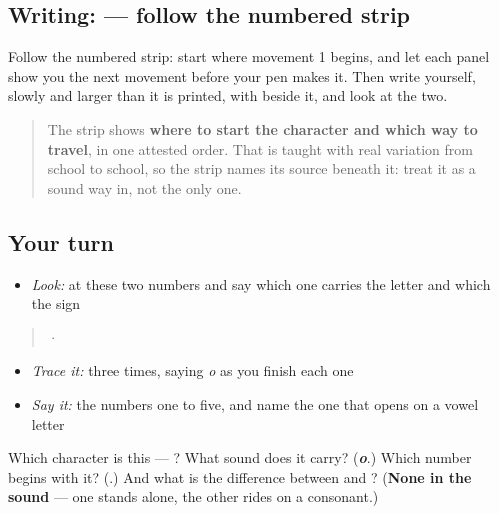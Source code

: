 \subsection*{Writing:  — follow the numbered strip}

Follow the numbered strip: start where movement 1 begins, and let each panel show you the next movement before your pen makes it. Then write  yourself, slowly and larger than it is printed, with  beside it, and look at the two.

\begin{quote}
The strip shows \textbf{where to start the character and which way to travel}, in one attested order. That is taught with real variation from school to school, so the strip names its source beneath it: treat it as a sound way in, not the only one.
\end{quote}

\subsection*{Your turn}
\begin{itemize}
\raggedright
  \item \emph{Look:} at these two numbers and say which one carries the letter  and which the sign 
\end{itemize}

\begin{quote}
  ·  
\end{quote}

\begin{itemize}
\raggedright
  \item \emph{Trace it:}  three times, saying \emph{o} as you finish each one
  \item \emph{Say it:} the numbers one to five, and name the one that opens on a vowel letter
\end{itemize}

\begin{tcolorbox}[breakable,colback=teal!4,colframe=teal!35!black,title={Before you move on}]
Which character is this — ? What sound does it carry? (\emph{\textbf{o}}.) Which number begins with it? (\textbf{}.) And what is the difference between  and ? (\textbf{None in the sound} — one stands alone, the other rides on a consonant.)
\end{tcolorbox}
